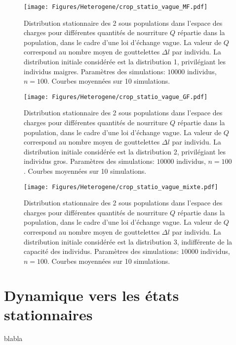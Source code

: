 \begin{figure}[h!]
\centering
\texttt{[image: Figures/Heterogene/crop\_statio\_vague\_MF.pdf]}
\caption{Distribution stationnaire des 2 sous populations dans l'espace des charges pour différentes quantités de nourriture $Q$ répartie dans la population, dans le cadre d'une loi d'échange vague. La valeur de $Q$ correspond au nombre moyen de gouttelettes $\Delta l$ par individu. La distribution initiale considérée est la distribution 1, privilégiant les individus maigres. Paramètres des simulations: $10000$ individus, $n=100$. Courbes moyennées sur 10 simulations.}
\label{statio_vague_MF}
\end{figure}

\begin{figure}[h!]
\centering
\texttt{[image: Figures/Heterogene/crop\_statio\_vague\_GF.pdf]}
\caption{Distribution stationnaire des 2 sous populations dans l'espace des charges pour différentes quantités de nourriture $Q$ répartie dans la population, dans le cadre d'une loi d'échange vague. La valeur de $Q$ correspond au nombre moyen de gouttelettes $\Delta l$ par individu. La distribution initiale considérée est la distribution 2, privilégiant les individus gros. Paramètres des simulations: $10000$ individus, $n=100$. Courbes moyennées sur 10 simulations.}
\label{statio_vague_GF}
\end{figure}

\begin{figure}[h!]
\centering
\texttt{[image: Figures/Heterogene/crop\_statio\_vague\_mixte.pdf]}
\caption{Distribution stationnaire des 2 sous populations dans l'espace des charges pour différentes quantités de nourriture $Q$ répartie dans la population, dans le cadre d'une loi d'échange vague. La valeur de $Q$ correspond au nombre moyen de gouttelettes $\Delta l$ par individu. La distribution initiale considérée est la distribution 3, indifférente de la capacité des individus. Paramètres des simulations: $10000$ individus, $n=100$. Courbes moyennées sur 10 simulations.}
\label{statio_vague_mixte}
\end{figure}


\section{Dynamique vers les états stationnaires}

blabla